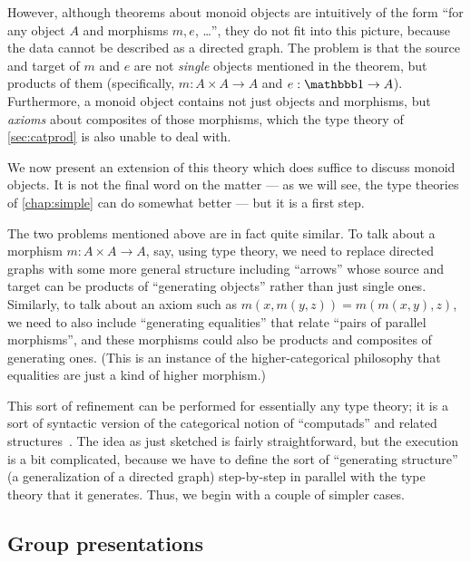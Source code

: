 However, although theorems about monoid objects are intuitively of the form ``for any object $A$ and morphisms $m,e$, \dots'', they do not fit into this picture, because the data cannot be described as a directed graph.
The problem is that the source and target of $m$ and $e$ are not \emph{single} objects mentioned in the theorem, but products of them (specifically, $m:A\times A\to A$ and $e:\unit\to A$).
Furthermore, a monoid object contains not just objects and morphisms, but \emph{axioms} about composites of those morphisms, which the type theory of \cref{sec:catprod} is also unable to deal with.

We now present an extension of this theory which does suffice to discuss monoid objects.
It is not the final word on the matter --- as we will see, the type theories of \cref{chap:simple} can do somewhat better --- but it is a first step.

The two problems mentioned above are in fact quite similar.
To talk about a morphism $m:A\times A\to A$, say, using type theory, we need to replace directed graphs with some more general structure including ``arrows'' whose source and target can be products of ``generating objects'' rather than just single ones.
Similarly, to talk about an axiom such as $m(x,m(y,z)) = m(m(x,y),z)$, we need to also include ``generating equalities'' that relate ``pairs of parallel morphisms'', and these morphisms could also be products and composites of generating ones.
(This is an instance of the higher-categorical philosophy that equalities are just a kind of higher morphism.)

This sort of refinement can be performed for essentially any type theory; it is a sort of syntactic version of the categorical notion of ``computads'' and related structures~\cite{batanin:cptd-fin,garner:hom-hcat,nlab:computad}.
The idea as just sketched is fairly straightforward, but the execution is a bit complicated, because we have to define the sort of ``generating structure'' (a generalization of a directed graph) step-by-step in parallel with the type theory that it generates.
Thus, we begin with a couple of simpler cases.


\subsection{Group presentations}
\label{sec:group-presentations}

